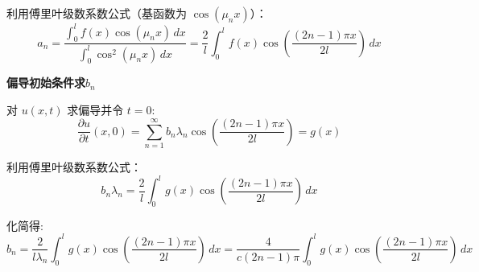 \documentclass[a4paper, 12pt, oneside]{article} %
\numberwithin{subsection}{section}
\numberwithin{subsubsection}{subsection}
\theoremstyle{plain}
\theoremstyle{definition}
\theoremstyle{remark}
\begin{document}
		利用傅里叶级数系数公式（基函数为 $\cos(\mu_n x)$）：
		\begin{equation}
			a_n = \frac{\int_0^l f(x) \cos(\mu_n x) \, dx}{\int_0^l \cos^2(\mu_n x) \, dx} = \frac{2}{l} \int_0^l f(x) \cos\left(\frac{(2n-1)\pi x}{2l}\right) \, dx
		\end{equation}
		
		\noindent
		\textbf{偏导初始条件求$b_n$}
		
		对 $u(x,t)$ 求偏导并令 $t=0$:
		\begin{equation}
			\frac{\partial u}{\partial t}(x, 0) = \sum_{n=1}^{\infty} b_n \lambda_n \cos\left(\frac{(2n-1)\pi x}{2l}\right) = g(x)
		\end{equation}
		
		利用傅里叶级数系数公式：
		\begin{equation}
			b_n \lambda_n = \frac{2}{l} \int_0^l g(x) \cos\left(\frac{(2n-1)\pi x}{2l}\right) \, dx
		\end{equation}
		
		化简得:
		\begin{equation}
			b_n = \frac{2}{l \lambda_n} \int_0^l g(x) \cos\left(\frac{(2n-1)\pi x}{2l}\right) \, dx = \frac{4}{c(2n-1)\pi} \int_0^l g(x) \cos\left(\frac{(2n-1)\pi x}{2l}\right) \, dx
		\end{equation}
		
\end{document}
